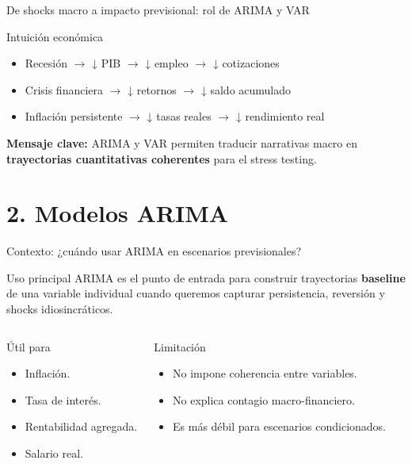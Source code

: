 \documentclass[10pt,aspectratio=169]{beamer}
\newcommand{\baseline}{\textcolor{MacropolTeal}{\textbf{baseline}}}
\begin{document}
\begin{frame}{De shocks macro a impacto previsional: rol de ARIMA y VAR}

\begin{block}{Intuición económica}
\begin{itemize}
    \item Recesión $\rightarrow$ ↓ PIB $\rightarrow$ ↓ empleo $\rightarrow$ ↓ cotizaciones
    \item Crisis financiera $\rightarrow$ ↓ retornos $\rightarrow$ ↓ saldo acumulado
    \item Inflación persistente $\rightarrow$ ↓ tasas reales $\rightarrow$ ↓ rendimiento real
\end{itemize}
\end{block}

\vspace{0.2cm}

\textbf{Mensaje clave:} ARIMA y VAR permiten traducir narrativas macro en \textbf{trayectorias cuantitativas coherentes} para el stress testing.

\end{frame}

\section{2. Modelos ARIMA}

\begin{frame}{Contexto: ¿cuándo usar ARIMA en escenarios previsionales?}
\begin{block}{Uso principal}
ARIMA es el punto de entrada para construir trayectorias \baseline{} de una variable individual cuando queremos capturar persistencia, reversión y shocks idiosincráticos.
\end{block}

\begin{columns}
\begin{block}{Útil para}
\begin{itemize}
  \item Inflación.
  \item Tasa de interés.
  \item Rentabilidad agregada.
  \item Salario real.
\end{itemize}
\end{block}

\begin{block}{Limitación}
\begin{itemize}
  \item No impone coherencia entre variables.
  \item No explica contagio macro-financiero.
  \item Es más débil para escenarios condicionados.
\end{itemize}
\end{block}
\end{columns}
\end{frame}
\end{document}
